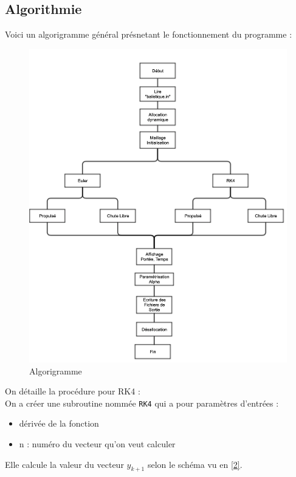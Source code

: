 \documentclass[a4paper,oneside]{article}
\makeatletter
\def\bigcenter{\trivlist \bigcentering\item\relax}
\def\bigcentering{\let\\\@centercr\rightskip\@bigflushglue%
\leftskip\@bigflushglue
\parindent\z@\parfillskip\z@skip}
\makeatother
\begin{document}
\subsection{Algorithmie}
Voici un algorigramme général présnetant le fonctionnement du programme :
\begin{figure}[h!]
\bigcenter

\centering
\includegraphics[scale=0.7] {algorigramme}
\caption{Algorigramme}	
\end{figure}

On détaille la procédure pour RK4 : 
\\

On a créer une subroutine nommée \verb?RK4? qui a pour paramètres d'entrées : 
\begin{itemize}
	\item dérivée de la fonction 
	\item n : numéro du vecteur qu'on veut calculer
\end{itemize}
Elle calcule la valeur du vecteur $y_{k+1}$ selon le schéma vu en \ref{2}. 
\\
\end{document}
